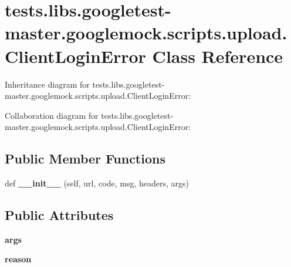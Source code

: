 \hypertarget{classtests_1_1libs_1_1googletest-master_1_1googlemock_1_1scripts_1_1upload_1_1ClientLoginError}{}\section{tests.\+libs.\+googletest-\/master.googlemock.\+scripts.\+upload.\+Client\+Login\+Error Class Reference}
\label{classtests_1_1libs_1_1googletest-master_1_1googlemock_1_1scripts_1_1upload_1_1ClientLoginError}


Inheritance diagram for tests.\+libs.\+googletest-\/master.googlemock.\+scripts.\+upload.\+Client\+Login\+Error\+:


Collaboration diagram for tests.\+libs.\+googletest-\/master.googlemock.\+scripts.\+upload.\+Client\+Login\+Error\+:
\subsection*{Public Member Functions}
\begin{DoxyCompactItemize}
\item 
\mbox{\label{classtests_1_1libs_1_1googletest-master_1_1googlemock_1_1scripts_1_1upload_1_1ClientLoginError_a074efe7754e06ac2cfb0fda0e5ad7ea1}} 
def {\bfseries \+\_\+\+\_\+init\+\_\+\+\_\+} (self, url, code, msg, headers, args)
\end{DoxyCompactItemize}
\subsection*{Public Attributes}
\begin{DoxyCompactItemize}
\item 
\mbox{\label{classtests_1_1libs_1_1googletest-master_1_1googlemock_1_1scripts_1_1upload_1_1ClientLoginError_a67dc15a855e8a7ef32409b10af602aff}} 
{\bfseries args}
\item 
\mbox{\label{classtests_1_1libs_1_1googletest-master_1_1googlemock_1_1scripts_1_1upload_1_1ClientLoginError_ab5b16de34d3062f49a36a862696b3a90}} 
{\bfseries reason}
\end{DoxyCompactItemize}


